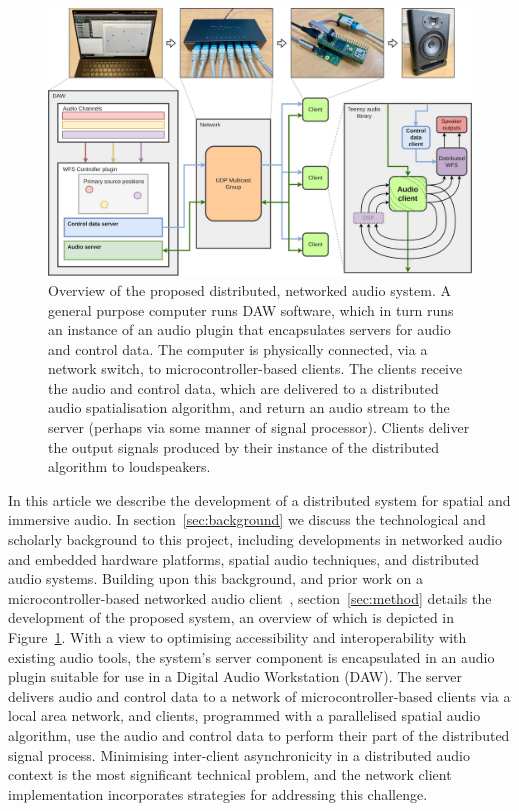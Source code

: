 \documentclass[utf8]{FrontiersinHarvard}
\newcommand{\figref}[1]{Figure~\ref{#1}}
\newcommand{\secref}[1]{section~\ref{#1}}
\begin{document}
    \begin{figure}[ht]
        \centering
        \includegraphics[width=\textwidth]{figures/system_overview}
        \caption{
            Overview of the proposed distributed, networked audio system.
            A general purpose computer runs DAW software, which in turn runs an
            instance of an audio plugin that encapsulates servers for audio and
            control data.
            The computer is physically connected, via a network switch, to
            microcontroller-based clients.
            The clients receive the audio and control data, which are delivered
            to a distributed audio spatialisation algorithm, and return an audio
            stream to the server (perhaps via some manner of signal processor).
            Clients deliver the output signals produced by their instance of the
            distributed algorithm to loudspeakers.
        }
        \label{fig:system-overview}
    \end{figure}

    In this article we describe the development of a distributed system for
    spatial and immersive audio.
    In \secref{sec:background} we discuss the technological and scholarly
    background to this project, including developments in networked audio and
    embedded hardware platforms, spatial audio techniques, and distributed audio
    systems.
    Building upon this background, and prior work on a microcontroller-based
    networked audio client~\citep{rushton_microcontroller-based_2023},
    \secref{sec:method} details the development of the proposed system, an
    overview of which is depicted in \figref{fig:system-overview}.
    With a view to optimising accessibility and interoperability with existing
    audio tools, the system's server component is encapsulated in an audio
    plugin suitable for use in a Digital Audio Workstation (DAW)\@.
    The server delivers audio and control data to a network of
    microcontroller-based clients via a local area network, and clients,
    programmed with a parallelised spatial audio algorithm, use the audio and
    control data to perform their part of the distributed signal process.
    Minimising inter-client asynchronicity in a distributed audio context is the
    most significant technical problem, and the network client implementation
    incorporates strategies for addressing this challenge.
\end{document}
